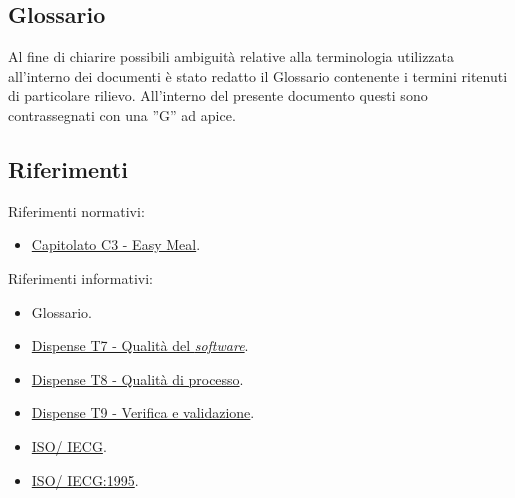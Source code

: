 \subsection{Glossario}
Al fine di chiarire possibili ambiguità relative alla terminologia utilizzata all'interno dei documenti è stato redatto il Glossario contenente i termini ritenuti di particolare rilievo.
All'interno del presente documento questi sono contrassegnati con una ”G” ad apice.

\subsection{Riferimenti}
Riferimenti normativi:
\begin{itemize}
	\item \href{https://www.math.unipd.it/~tullio/IS-1/2023/Progetto/C3.pdf}{Capitolato C3 - Easy Meal}.
\end{itemize}

\noindent
Riferimenti informativi:
\begin{itemize}
	\item Glossario.
	\item \href{https://www.math.unipd.it/~tullio/IS-1/2023/Dispense/T7.pdf}{Dispense T7 - Qualità del \textit{software}}.
	\item \href{https://www.math.unipd.it/~tullio/IS-1/2023/Dispense/T8.pdf}{Dispense T8 - Qualità di processo}.
	\item \href{https://www.math.unipd.it/~tullio/IS-1/2023/Dispense/T9.pdf}{Dispense T9 - Verifica e validazione}.
	\item \href{https://it.wikipedia.org/wiki/ISO/IEC_9126}{ISO\g/ IECG}.
	\item \href{https://www.math.unipd.it/~tullio/IS-1/2009/Approfondimenti/ISO_12207-1995.pdf}{ISO\g/ IECG:1995}.
\end{itemize}
